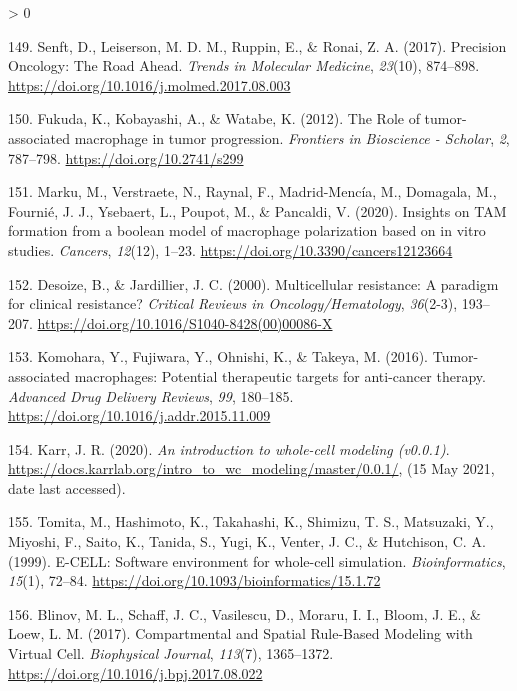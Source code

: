 \documentclass[
  12pt,
]{book}
\newlength{\cslhangindent}
\newenvironment{CSLReferences}[2] %
 {%
  \setlength{\parindent}{0pt}
  \ifodd #1 \everypar{\setlength{\hangindent}{\cslhangindent}}\ignorespaces\fi
  \ifnum #2 > 0
  \setlength{\parskip}{#2\baselineskip}
  \fi
 }%
 {}
\begin{document}
\begin{CSLReferences}{1}{0}
\leavevmode\hypertarget{ref-Senft2017}{}%
149. Senft, D., Leiserson, M. D. M., Ruppin, E., \& Ronai, Z. A. (2017). {Precision Oncology: The Road Ahead}. \emph{Trends in Molecular Medicine}, \emph{23}(10), 874--898. \url{https://doi.org/10.1016/j.molmed.2017.08.003}

\leavevmode\hypertarget{ref-Fukuda2012}{}%
150. Fukuda, K., Kobayashi, A., \& Watabe, K. (2012). {The Role of tumor-associated macrophage in tumor progression}. \emph{Frontiers in Bioscience - Scholar}, \emph{2}, 787--798. \url{https://doi.org/10.2741/s299}

\leavevmode\hypertarget{ref-Marku2020}{}%
151. Marku, M., Verstraete, N., Raynal, F., Madrid-Mencía, M., Domagala, M., Fournié, J. J., Ysebaert, L., Poupot, M., \& Pancaldi, V. (2020). {Insights on TAM formation from a boolean model of macrophage polarization based on in vitro studies}. \emph{Cancers}, \emph{12}(12), 1--23. \url{https://doi.org/10.3390/cancers12123664}

\leavevmode\hypertarget{ref-Desoize2000}{}%
152. Desoize, B., \& Jardillier, J. C. (2000). {Multicellular resistance: A paradigm for clinical resistance?} \emph{Critical Reviews in Oncology/Hematology}, \emph{36}(2-3), 193--207. \url{https://doi.org/10.1016/S1040-8428(00)00086-X}

\leavevmode\hypertarget{ref-Komohara2016}{}%
153. Komohara, Y., Fujiwara, Y., Ohnishi, K., \& Takeya, M. (2016). {Tumor-associated macrophages: Potential therapeutic targets for anti-cancer therapy}. \emph{Advanced Drug Delivery Reviews}, \emph{99}, 180--185. \url{https://doi.org/10.1016/j.addr.2015.11.009}

\leavevmode\hypertarget{ref-whole-cell-doc}{}%
154. Karr, J. R. (2020). \emph{{An introduction to whole-cell modeling (v0.0.1)}}. \url{https://docs.karrlab.org/intro_to_wc_modeling/master/0.0.1/}, (15 May 2021, date last accessed).

\leavevmode\hypertarget{ref-Tomita1999}{}%
155. Tomita, M., Hashimoto, K., Takahashi, K., Shimizu, T. S., Matsuzaki, Y., Miyoshi, F., Saito, K., Tanida, S., Yugi, K., Venter, J. C., \& Hutchison, C. A. (1999). {E-CELL: Software environment for whole-cell simulation}. \emph{Bioinformatics}, \emph{15}(1), 72--84. \url{https://doi.org/10.1093/bioinformatics/15.1.72}

\leavevmode\hypertarget{ref-Blinov2017}{}%
156. Blinov, M. L., Schaff, J. C., Vasilescu, D., Moraru, I. I., Bloom, J. E., \& Loew, L. M. (2017). {Compartmental and Spatial Rule-Based Modeling with Virtual Cell}. \emph{Biophysical Journal}, \emph{113}(7), 1365--1372. \url{https://doi.org/10.1016/j.bpj.2017.08.022}


\end{CSLReferences}
\end{document}

